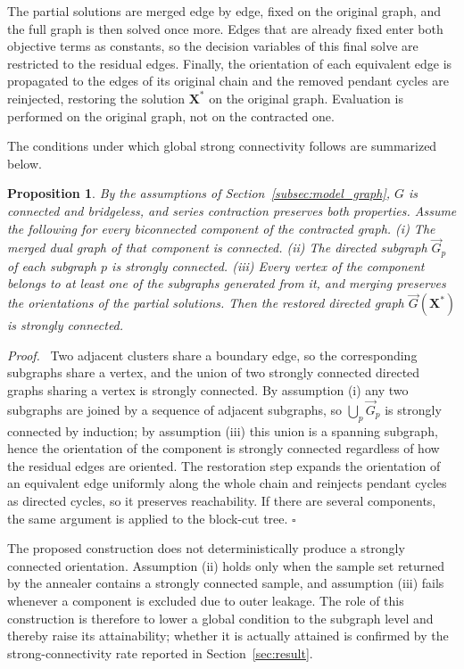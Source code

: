 \documentclass[twocolumn,a4paper]{article}
\newtheorem{proposition}[theorem]{Proposition}
\newenvironment{proof}{\par\noindent\textit{Proof.}\ }{\hfill\(\square\)\par\medskip}
\begin{document}
The partial solutions are merged edge by edge, fixed on the original graph, and the full graph is then solved once more. Edges that are already fixed enter both objective terms as constants, so the decision variables of this final solve are restricted to the residual edges. Finally, the orientation of each equivalent edge is propagated to the edges of its original chain and the removed pendant cycles are reinjected, restoring the solution \(\mathbf{X}^{*}\) on the original graph. Evaluation is performed on the original graph, not on the contracted one.

The conditions under which global strong connectivity follows are summarized below.

\begin{proposition} \label{prop:sc}
By the assumptions of Section~\ref{subsec:model_graph}, \(G\) is connected and bridgeless, and series contraction preserves both properties. Assume the following for every biconnected component of the contracted graph. (i) The merged dual graph of that component is connected. (ii) The directed subgraph \(\vec{G}_p\) of each subgraph \(p\) is strongly connected. (iii) Every vertex of the component belongs to at least one of the subgraphs generated from it, and merging preserves the orientations of the partial solutions. Then the restored directed graph \(\vec{G}(\mathbf{X}^{*})\) is strongly connected.
\end{proposition}

\begin{proof}
Two adjacent clusters share a boundary edge, so the corresponding subgraphs share a vertex, and the union of two strongly connected directed graphs sharing a vertex is strongly connected. By assumption (i) any two subgraphs are joined by a sequence of adjacent subgraphs, so \(\bigcup_p\vec{G}_p\) is strongly connected by induction; by assumption (iii) this union is a spanning subgraph, hence the orientation of the component is strongly connected regardless of how the residual edges are oriented. The restoration step expands the orientation of an equivalent edge uniformly along the whole chain and reinjects pendant cycles as directed cycles, so it preserves reachability. If there are several components, the same argument is applied to the block-cut tree.
\end{proof}

The proposed construction does not deterministically produce a strongly connected orientation. Assumption (ii) holds only when the sample set returned by the annealer contains a strongly connected sample, and assumption (iii) fails whenever a component is excluded due to outer leakage. The role of this construction is therefore to lower a global condition to the subgraph level and thereby raise its attainability; whether it is actually attained is confirmed by the strong-connectivity rate reported in Section~\ref{sec:result}.
\end{document}
